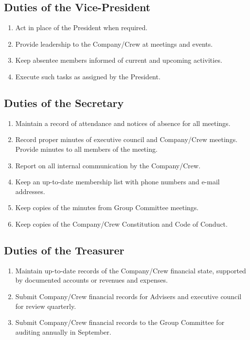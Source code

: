 \subsection{Duties of the Vice-President}
\begin{enumerate}
    \item Act in place of the President when required.
    \item Provide leadership to the Company/Crew at meetings and events.
    \item Keep absentee members informed of current and upcoming activities.
    \item Execute such tasks as assigned by the President.
\end{enumerate}

\subsection{Duties of the Secretary}
\begin{enumerate}
    \item Maintain a record of attendance and notices of absence for all meetings.
    \item Record proper minutes of executive council and Company/Crew meetings.
    Provide minutes to all members of the meeting.
    \item Report on all internal communication by the Company/Crew.
    \item Keep an up-to-date membership list with phone numbers and e-mail addresses.
    \item Keep copies of the minutes from Group Committee meetings.
    \item Keep copies of the Company/Crew Constitution and Code of Conduct.
\end{enumerate}

\subsection{Duties of the Treasurer}
\begin{enumerate}
    \item Maintain up-to-date records of the Company/Crew financial state, supported by documented accounts or revenues and expenses.
    \item Submit Company/Crew financial records for Advisers and executive council for review quarterly.
    \item Submit Company/Crew financial records to the Group Committee for auditing annually in September.
\end{enumerate}

